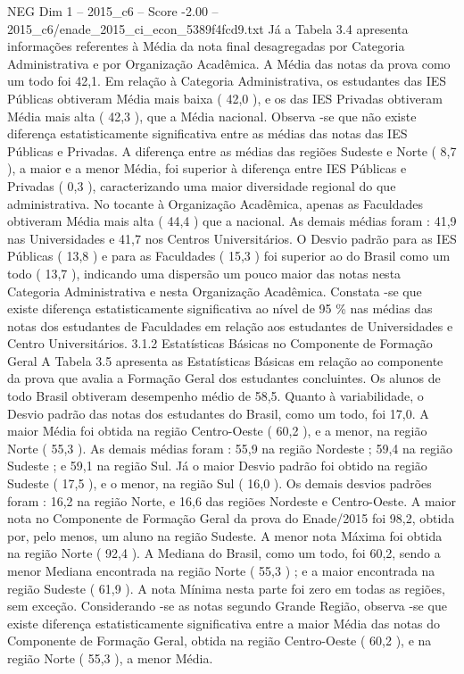 \begin{textsample}{NEG Dim 1 – 2015\_c6 – Score -2.00 – 2015\_c6/enade\_2015\_ci\_econ\_5389f4fcd9.txt}
Já a Tabela 3.4 apresenta informações referentes à Média da nota final desagregadas por Categoria Administrativa e por Organização Acadêmica.
A Média das notas da prova como um todo foi 42,1.
Em relação à Categoria Administrativa, os estudantes das IES Públicas obtiveram Média mais baixa ( 42,0 ), e os das IES Privadas obtiveram Média mais alta ( 42,3 ), que a Média nacional.
Observa -se que não existe diferença estatisticamente significativa entre as médias das notas das IES Públicas e Privadas.
A diferença entre as médias das regiões Sudeste e Norte ( 8,7 ), a maior e a menor Média, foi superior à diferença entre IES Públicas e Privadas ( 0,3 ), caracterizando uma maior diversidade regional do que administrativa.
No tocante à Organização Acadêmica, apenas as Faculdades obtiveram Média mais alta ( 44,4 ) que a nacional.
As demais médias foram : 41,9 nas Universidades e 41,7 nos Centros Universitários.
O Desvio padrão para as IES Públicas ( 13,8 ) e para as Faculdades ( 15,3 ) foi superior ao do Brasil como um todo ( 13,7 ), indicando uma dispersão um pouco maior das notas nesta Categoria Administrativa e nesta Organização Acadêmica.
Constata -se que existe diferença estatisticamente significativa ao nível de 95 \% nas médias das notas dos estudantes de Faculdades em relação aos estudantes de Universidades e Centro Universitários. 3.1.2 Estatísticas Básicas no Componente de Formação Geral A Tabela 3.5 apresenta as Estatísticas Básicas em relação ao componente da prova que avalia a Formação Geral dos estudantes concluintes.
Os alunos de todo Brasil obtiveram desempenho médio de 58,5.
Quanto à variabilidade, o Desvio padrão das notas dos estudantes do Brasil, como um todo, foi 17,0.
A maior Média foi obtida na região Centro-Oeste ( 60,2 ), e a menor, na região Norte ( 55,3 ).
As demais médias foram : 55,9 na região Nordeste ; 59,4 na região Sudeste ; e 59,1 na região Sul.
Já o maior Desvio padrão foi obtido na região Sudeste ( 17,5 ), e o menor, na região Sul ( 16,0 ).
Os demais desvios padrões foram : 16,2 na região Norte, e 16,6 das regiões Nordeste e Centro-Oeste.
A maior nota no Componente de Formação Geral da prova do Enade/2015 foi 98,2, obtida por, pelo menos, um aluno na região Sudeste.
A menor nota Máxima foi obtida na região Norte ( 92,4 ).
A Mediana do Brasil, como um todo, foi 60,2, sendo a menor Mediana encontrada na região Norte ( 55,3 ) ; e a maior encontrada na região Sudeste ( 61,9 ).
A nota Mínima nesta parte foi zero em todas as regiões, sem exceção.
Considerando -se as notas segundo Grande Região, observa -se que existe diferença estatisticamente significativa entre a maior Média das notas do Componente de Formação Geral, obtida na região Centro-Oeste ( 60,2 ), e na região Norte ( 55,3 ), a menor Média.

\end{textsample}
